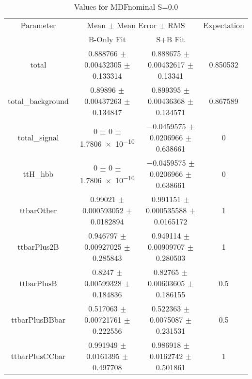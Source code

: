 \begin{table}
\centering
\caption{Values for MDFnominal S=0.0}
\begin{tabular}{cccc}
\toprule
Parameter & \multicolumn{2}{c}{Mean $\pm$ Mean Error $\pm$ RMS} & Expectation\\
 & B-Only Fit & S+B Fit & \\
\midrule
total & \num{0.888766} $\pm$ \num{0.00432305} $\pm$ \num{0.133314} & \num{0.888675} $\pm$ \num{0.00432617} $\pm$ \num{0.13341} & \num{0.850532}\\
total\_background & \num{0.89896} $\pm$ \num{0.00437263} $\pm$ \num{0.134847} & \num{0.899395} $\pm$ \num{0.00436368} $\pm$ \num{0.134571} & \num{0.867589}\\
total\_signal & \num{0} $\pm$ \num{0} $\pm$ \num{1.7806e-10} & \num{-0.0459575} $\pm$ \num{0.0206966} $\pm$ \num{0.638661} & \num{0}\\
ttH\_hbb & \num{0} $\pm$ \num{0} $\pm$ \num{1.7806e-10} & \num{-0.0459575} $\pm$ \num{0.0206966} $\pm$ \num{0.638661} & \num{0}\\
ttbarOther & \num{0.99021} $\pm$ \num{0.000593052} $\pm$ \num{0.0182894} & \num{0.991151} $\pm$ \num{0.000535588} $\pm$ \num{0.0165172} & \num{1}\\
ttbarPlus2B & \num{0.946797} $\pm$ \num{0.00927025} $\pm$ \num{0.285843} & \num{0.949114} $\pm$ \num{0.00909707} $\pm$ \num{0.280503} & \num{1}\\
ttbarPlusB & \num{0.8247} $\pm$ \num{0.00599328} $\pm$ \num{0.184836} & \num{0.82765} $\pm$ \num{0.00603605} $\pm$ \num{0.186155} & \num{0.5}\\
ttbarPlusBBbar & \num{0.517063} $\pm$ \num{0.00721761} $\pm$ \num{0.222556} & \num{0.522363} $\pm$ \num{0.0075087} $\pm$ \num{0.231531} & \num{0.5}\\
ttbarPlusCCbar & \num{0.991949} $\pm$ \num{0.0161395} $\pm$ \num{0.497708} & \num{0.986918} $\pm$ \num{0.0162742} $\pm$ \num{0.501861} & \num{1}\\
\bottomrule
\end{tabular}
\end{table}